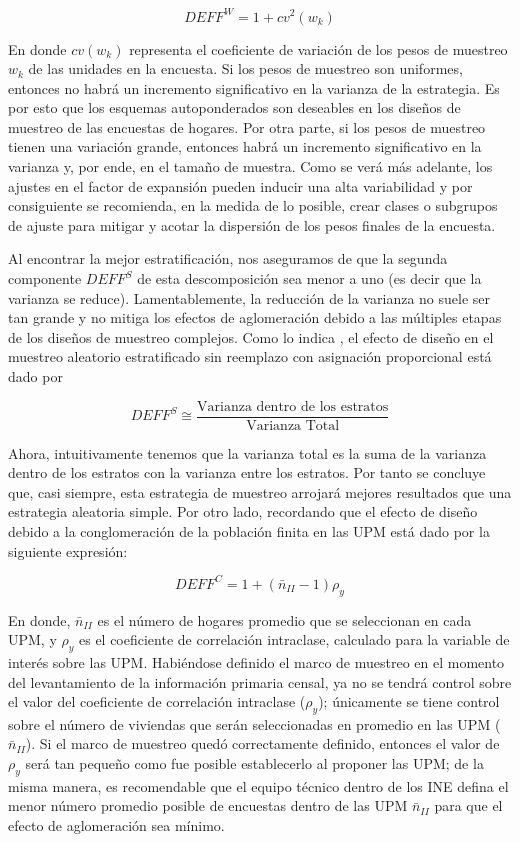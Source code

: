 \documentclass[
  12pt,
]{book}
\begin{document}
\[
DEFF^W = 1 + cv^2(w_k)
\]

En donde \(cv(w_k)\) representa el coeficiente de variación de los pesos de muestreo \(w_k\) de las unidades en la encuesta. Si los pesos de muestreo son uniformes, entonces no habrá un incremento significativo en la varianza de la estrategia. Es por esto que los esquemas autoponderados son deseables en los diseños de muestreo de las encuestas de hogares. Por otra parte, si los pesos de muestreo tienen una variación grande, entonces habrá un incremento significativo en la varianza y, por ende, en el tamaño de muestra. Como se verá más adelante, los ajustes en el factor de expansión pueden inducir una alta variabilidad y por consiguiente se recomienda, en la medida de lo posible, crear clases o subgrupos de ajuste para mitigar y acotar la dispersión de los pesos finales de la encuesta.

Al encontrar la mejor estratificación, nos aseguramos de que la segunda componente \(DEFF^S\) de esta descomposición sea menor a uno (es decir que la varianza se reduce). Lamentablemente, la reducción de la varianza no suele ser tan grande y no mitiga los efectos de aglomeración debido a las múltiples etapas de los diseños de muestreo complejos. Como lo indica \citet{Gutierrez_2016}, el efecto de diseño en el muestreo aleatorio estratificado sin reemplazo con asignación proporcional está dado por

\[
DEFF^S \cong\frac{\text{Varianza dentro de los estratos}}{\text{Varianza Total}}
\]

Ahora, intuitivamente tenemos que la varianza total es la suma de la varianza dentro de los estratos con la varianza entre los estratos. Por tanto se concluye que, casi siempre, esta estrategia de muestreo arrojará mejores resultados que una estrategia aleatoria simple. Por otro lado, recordando que el efecto de diseño debido a la conglomeración de la población finita en las UPM está dado por la siguiente expresión:

\[
DEFF^C = 1 + (\bar{n}_{II}-1)\rho_y
\]

En donde, \(\bar{n}_{II}\) es el número de hogares promedio que se seleccionan en cada UPM, y \(\rho_y\) es el coeficiente de correlación intraclase, calculado para la variable de interés sobre las UPM. Habiéndose definido el marco de muestreo en el momento del levantamiento de la información primaria censal, ya no se tendrá control sobre el valor del coeficiente de correlación intraclase (\(\rho_y\)); únicamente se tiene control sobre el número de viviendas que serán seleccionadas en promedio en las UPM (\(\bar{n}_{II}\)). Si el marco de muestreo quedó correctamente definido, entonces el valor de \(\rho_y\) será tan pequeño como fue posible establecerlo al proponer las UPM; de la misma manera, es recomendable que el equipo técnico dentro de los INE defina el menor número promedio posible de encuestas dentro de las UPM \(\bar{n}_{II}\) para que el efecto de aglomeración sea mínimo.
\end{document}
